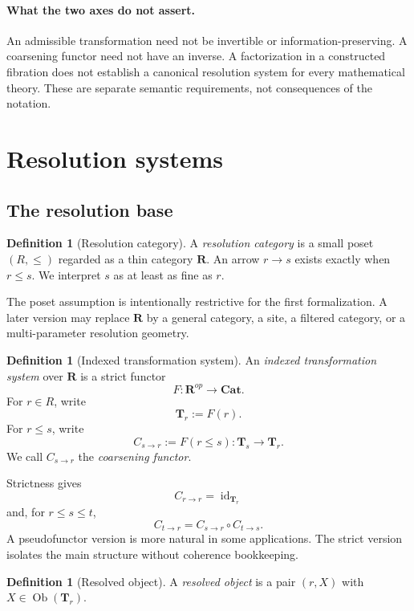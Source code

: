 \documentclass[11pt]{article}
\theoremstyle{definition}
\newtheorem{definition}[theorem]{Definition}
\theoremstyle{remark}
\newcommand{\Rcat}{\mathbf R}
\newcommand{\Tcat}{\mathbf T}
\newcommand{\Cat}{\mathbf{Cat}}
\newcommand{\Ob}{\operatorname{Ob}}
\newcommand{\id}{\operatorname{id}}
\begin{document}
\paragraph{What the two axes do not assert.}
An admissible transformation need not be invertible or information-preserving. A coarsening functor need not have an inverse. A factorization in a constructed fibration does not establish a canonical resolution system for every mathematical theory. These are separate semantic requirements, not consequences of the notation.

\section{Resolution systems}

\subsection{The resolution base}

\begin{definition}[Resolution category]
A \emph{resolution category} is a small poset $(R,\le)$ regarded as a thin category $\Rcat$. An arrow $r\to s$ exists exactly when $r\le s$. We interpret $s$ as at least as fine as $r$.
\end{definition}

The poset assumption is intentionally restrictive for the first formalization. A later version may replace $\Rcat$ by a general category, a site, a filtered category, or a multi-parameter resolution geometry.

\begin{definition}[Indexed transformation system]
An \emph{indexed transformation system} over $\Rcat$ is a strict functor
\[
F:\Rcat^{op}\longrightarrow\Cat.
\]
For $r\in R$, write
\[
\Tcat_r:=F(r).
\]
For $r\le s$, write
\[
C_{s\to r}:=F(r\le s):\Tcat_s\longrightarrow\Tcat_r.
\]
We call $C_{s\to r}$ the \emph{coarsening functor}.
\end{definition}

Strictness gives
\[
C_{r\to r}=\id_{\Tcat_r}
\]
and, for $r\le s\le t$,
\[
C_{t\to r}=C_{s\to r}\circ C_{t\to s}.
\]
A pseudofunctor version is more natural in some applications. The strict version isolates the main structure without coherence bookkeeping.

\begin{definition}[Resolved object]
A \emph{resolved object} is a pair $(r,X)$ with $X\in\Ob(\Tcat_r)$.
\end{definition}
\end{document}
